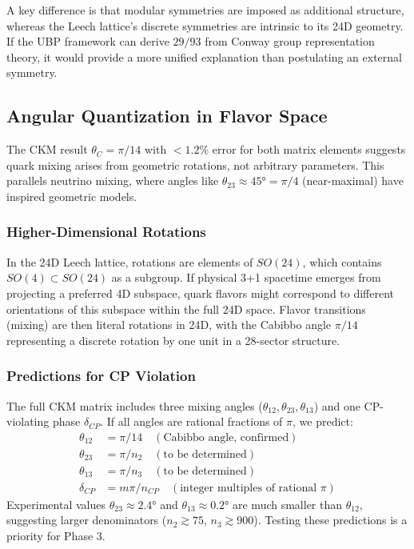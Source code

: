 \documentclass[11pt,a4paper]{article}
\begin{document}
A key difference is that modular symmetries are imposed as additional structure, whereas the Leech lattice's discrete symmetries are intrinsic to its 24D geometry. If the UBP framework can derive $29/93$ from Conway group representation theory, it would provide a more unified explanation than postulating an external symmetry.

\subsection{Angular Quantization in Flavor Space}

The CKM result $\theta_C = \pi/14$ with $<1.2\%$ error for both matrix elements suggests quark mixing arises from geometric rotations, not arbitrary parameters. This parallels neutrino mixing, where angles like $\theta_{23} \approx 45° = \pi/4$ (near-maximal) have inspired geometric models.

\subsubsection{Higher-Dimensional Rotations}

In the 24D Leech lattice, rotations are elements of $SO(24)$, which contains $SO(4) \subset SO(24)$ as a subgroup. If physical 3+1 spacetime emerges from projecting a preferred 4D subspace, quark flavors might correspond to different orientations of this subspace within the full 24D space. Flavor transitions (mixing) are then literal rotations in 24D, with the Cabibbo angle $\pi/14$ representing a discrete rotation by one unit in a 28-sector structure.

\subsubsection{Predictions for CP Violation}

The full CKM matrix includes three mixing angles ($\theta_{12}, \theta_{23}, \theta_{13}$) and one CP-violating phase $\delta_{CP}$. If all angles are rational fractions of $\pi$, we predict:
\begin{align}
\theta_{12} &= \pi/14 \quad (\text{Cabibbo angle, confirmed}) \\
\theta_{23} &= \pi/n_2 \quad (\text{to be determined}) \\
\theta_{13} &= \pi/n_3 \quad (\text{to be determined}) \\
\delta_{CP} &= m \pi / n_{CP} \quad (\text{integer multiples of rational } \pi)
\end{align}
Experimental values $\theta_{23} \approx 2.4°$ and $\theta_{13} \approx 0.2°$ are much smaller than $\theta_{12}$, suggesting larger denominators ($n_2 \gtrsim 75$, $n_3 \gtrsim 900$). Testing these predictions is a priority for Phase 3.
\end{document}
